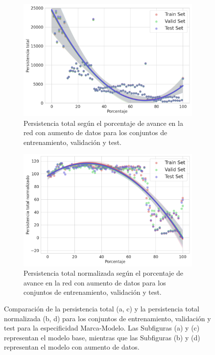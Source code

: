 \begin{figure}[H]
\begin{subfigure}{.45\textwidth}
		\includegraphics[width=\linewidth]{img/mm_set_trans.png}
		\caption{Persistencia total según el porcentaje de avance en la red con aumento de datos para los conjuntos de entrenamiento, validación y test.}
		\label{fig:mm_set_trans}
	\end{subfigure}%
	\begin{subfigure}{.45\textwidth}
		\centering
		\includegraphics[width=\linewidth]{img/mm_set_trans_norm.png}
		\caption{Persistencia total normalizada según el porcentaje de avance en la red con aumento de datos para los conjuntos de entrenamiento, validación y test.}
		\label{fig:mm_set_trans_norm}
	\end{subfigure}
	\caption{Comparación de la persistencia total (a, c) y la persistencia total normalizada (b, d) para los conjuntos de entrenamiento, validación y test para la especificidad Marca-Modelo. Las Subfiguras (a) y (c) representan el modelo base, mientras que las Subfiguras (b) y (d) representan el modelo con aumento de datos.}
	\label{fig:mm-set}
\end{figure}

